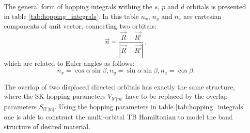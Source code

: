 The general form of hopping integrals withing the $s$, $p$ and $d$ orbitals is presented in table \ref{tab:hopping_integrals}. In this table $n_x$, $n_y$ and $n_z$ are cartesian components of unit vector, connecting two orbitals:
\begin{equation}
	\vec{n} = \frac{\vec{R} - \vec{R'}}{|\vec{R} - \vec{R'}|},
\end{equation}
which are related to Euler angles as follows:
\begin{equation}
	n_x =\cos{\alpha} \sin{\beta}, n_y = \sin{\alpha} \sin{\beta}, n_z = \cos{\beta}. 
\end{equation}

The overlap of two displaced directed orbitals has exactly the same structure, where the SK hopping parameters $V_{l l' |m|}$ have to be replaced by the overlap parameters $S_{l l' |m|}$. Using the hopping parameters in table \ref{tab:hopping_integrals} one is able to construct the multi-orbital TB Hamiltonian to model the band structure of desired material.

